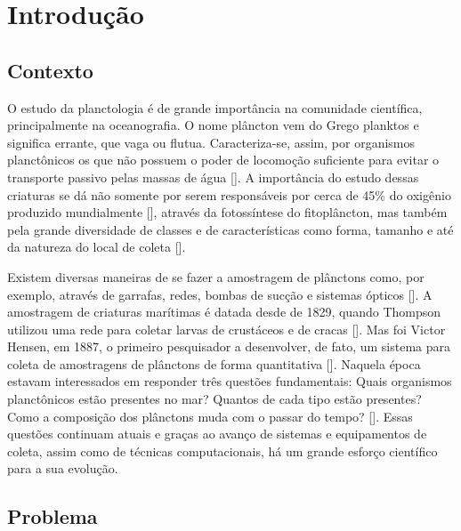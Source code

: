 \chapter{Introdução}
\label{cap:introducao}

\section{Contexto}
\label{sec:intro_contexto}

O estudo da planctologia é de grande importância na comunidade científica, principalmente na oceanografia. O nome plâncton vem do Grego planktos e significa errante, que vaga ou flutua. Caracteriza-se, assim, por organismos planctônicos os que não possuem o poder de locomoção suficiente para evitar o transporte passivo pelas massas de água [\cite{calazans2011organismos}].  A importância do estudo dessas criaturas se dá não somente por serem responsáveis por cerca de 45\% do oxigênio produzido mundialmente [\cite{brierleyplankton}],  através da fotossíntese do fitoplâncton, mas também pela grande diversidade de classes e de características como forma, tamanho e até da natureza do local de coleta [\cite{calazans2011organismos}]. 


Existem diversas maneiras de se fazer a amostragem de plânctons como, por exemplo, através de garrafas, redes, bombas de sucção e sistemas ópticos [\cite{calazans2011organismos}]. A amostragem de criaturas marítimas é datada desde de 1829, quando Thompson utilizou uma rede para coletar larvas de crustáceos e de cracas [\cite{brierleyplankton}]. Mas foi Victor Hensen, em 1887, o primeiro pesquisador a desenvolver, de fato, um sistema para coleta de amostragens de plânctons de forma quantitativa [\cite{benfield2007rapid, wiebe2003hensen, allen1919contribution}]. Naquela época estavam interessados em responder três questões fundamentais: Quais organismos planctônicos estão presentes no mar?  Quantos de cada tipo estão presentes? Como a composição dos plânctons muda com o passar do tempo?  [\cite{benfield2007rapid}]. Essas questões continuam atuais e graças ao avanço de sistemas e equipamentos de coleta, assim como de técnicas computacionais, há um grande esforço científico para a sua evolução. 


\section{Problema}
\label{sec:intro_problema}

